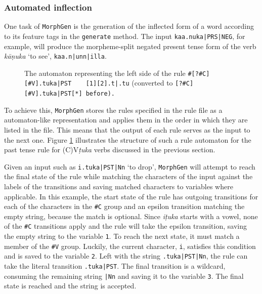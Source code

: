 \documentclass[a4paper]{article}
\newcommand{\tab}{~~~}
\newcommand{\arr}{$\rightarrow$ }
\newcommand{\typ}[1]{\texttt{#1}}
\begin{document}
\subsubsection{Automated inflection}

One task of \typ{MorphGen} is the generation of the inflected form of a word according to its feature tags in the \typ{generate} method. The input \typ{kaa.nuka|PRS|NEG}, for example, will produce the morpheme-split negated present tense form of the verb \textit{kāṇuka} `to see', \typ{kaa.n|unn|illa}.

\begin{figure}
\caption{The automaton representing the left side of the rule \typ{\#[?\#C][\#V].tuka|PST \tab [1][2].t|.tu} (converted to \typ{[?\#C][\#V].tuka|PST[*] before).}}
\label{morphrule}
\end{figure}

To achieve this, \typ{MorphGen} stores the rules specified in the rule file as a automaton-like representation and applies them in the order in which they are listed in the file. This means that the output of each rule serves as the input to the next one. Figure \ref{morphrule} illustrates the structure of such a rule automaton for the past tense rule for (C)V\textit{ṭuka} verbs discussed in the previous section.

Given an input such as \typ{i.tuka|PST|Nn} `to drop', \typ{MorphGen} will attempt to reach the final state of the rule while matching the characters of the input against the labels of the transitions and saving matched characters to variables where applicable. In this example, the start state of the rule has outgoing transitions for each of the characters in the \typ{\#C} group and an epsilon transition matching the empty string, because the match is optional. Since \textit{iṭuka} starts with a vowel, none of the \typ{\#C} transitions apply and the rule will take the epsilon transition, saving the empty string to the variable \typ{1}. To reach the next state, it must match a member of the \typ{\#V} group. Luckily, the current character, \typ{i}, satisfies this condition and is saved to the variable \typ{2}. Left with the string \typ{.tuka|PST|Nn}, the rule can take the literal transition \typ{.tuka|PST}. The final transition is a wildcard, consuming the remaining string \typ{|Nn} and saving it to the variable \typ{3}. The final state is reached and the string is accepted.
\end{document}
